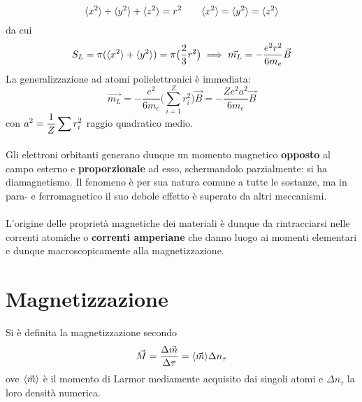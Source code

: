 \[\langle x^2 \rangle + \langle y^2 \rangle + \langle z^2 \rangle = r^2 \qquad \langle x^2 \rangle = \langle y^2 \rangle = \langle z^2 \rangle\]
da cui
\[S_L = \pi (\langle x^2 \rangle + \langle y^2 \rangle) = \pi \big(\frac{2}{3} r^2\big) \implies \vec{m_L} = - \frac{e^2 r^2}{6 m_e} \vec{B}\]
La generalizzazione ad atomi polielettronici è immediata:
\[\vec{m_L} = - \frac{e^2}{6 m_e} \big(\sum\limits_{i=1}^{Z} r_i^2\big) \vec{B} = -  \frac{Z e^2 a^2}{6 m_e} \vec{B}\]
con $\displaystyle a^2 = \frac{1}{Z} \sum r_i^2$ raggio quadratico medio.
\\~\\
Gli elettroni orbitanti generano dunque un momento magnetico \textbf{opposto} al campo esterno e \textbf{proporzionale} ad esso, schermandolo parzialmente: si ha diamagnetismo. Il fenomeno è per sua natura comune a tutte le sostanze, ma in para- e ferromagnetico il suo debole effetto è superato da altri meccanismi.
\\~\\
L'origine delle proprietà magnetiche dei materiali è dunque da rintracciarsi nelle correnti atomiche o \textbf{correnti amperiane} che danno luogo ai momenti elementari e dunque macroscopicamente alla magnetizzazione.


\section{Magnetizzazione}
Si è definita la magnetizzazione secondo
\[\vec{M} = \frac{\Delta \vec{m}}{\Delta \tau} = \langle \vec{m} \rangle \Delta n_\tau\]
ove $\langle \vec{m} \rangle$ è il momento di Larmor mediamente acquisito dai singoli atomi e $\Delta n_\tau$ la loro densità numerica.

